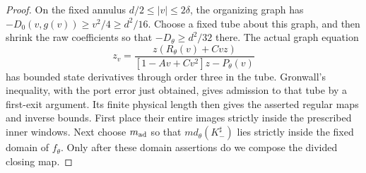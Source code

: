 \begin{proof}
On the fixed annulus \(d/2\le|v|\le2\delta\), the organizing graph
has \(-D_0(v,g(v))\ge v^2/4\ge d^2/16\).
Choose a fixed tube about this graph, and then shrink the raw
coefficients so that \(-D_\theta\ge d^2/32\) there. The actual
graph equation
\[
 z_v=\frac{z(R_\theta(v)+Cvz)}
                {[1-Av+Cv^2]z-P_\theta(v)}
\]
has bounded state derivatives through order three in the tube.
Gronwall's inequality, with the port error just obtained, gives
admission to that tube by a first-exit argument. Its finite physical
length then gives the asserted regular maps and inverse bounds.
First place their entire images strictly inside the prescribed inner
windows. Next choose \(m_{\rm ad}\) so that
\(m d_\theta(K_-^\sharp)\) lies strictly inside the fixed domain of
\(f_\theta\). Only after these domain assertions do we compose the
divided closing map.
\end{proof}

